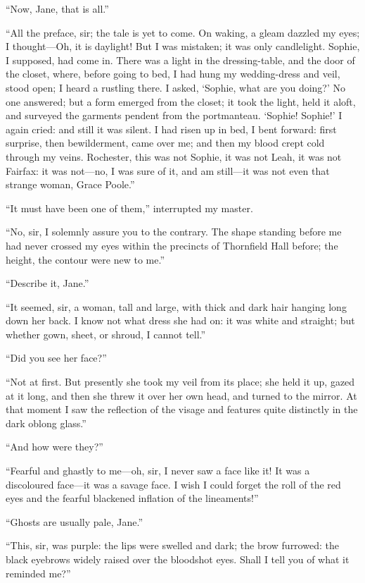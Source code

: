 \enquote{Now, Jane, that is all.}

\enquote{All the preface, sir; the tale is yet to come.  On waking, a
	gleam dazzled my eyes; I thought---Oh, it is daylight!  But I was
	mistaken; it was only candlelight.  Sophie, I supposed, had come in.
	There was a light in the dressing-table, and the door of the closet,
	where, before going to bed, I had hung my wedding-dress and veil, stood
	open; I heard a rustling there.  I asked, \enquote{Sophie, what are you
		doing?}  No one answered; but a form emerged from the closet; it took
	the light, held it aloft, and surveyed the garments pendent from the
	portmanteau.  \enquote{Sophie!  Sophie!}  I again cried: and still it
	was silent.  I had risen up in bed, I bent forward: first surprise, then
	bewilderment, came over me; and then my blood crept cold through my
	veins.  \Mr{} Rochester, this was not Sophie, it was not Leah, it was not
	\Mrs{} Fairfax: it was not---no, I was sure of it, and am still---it was
	not even that strange woman, Grace Poole.}

\enquote{It must have been one of them,} interrupted my master.

\enquote{No, sir, I solemnly assure you to the contrary.  The shape
	standing before me had never crossed my eyes within the precincts of
	Thornfield Hall before; the height, the contour were new to me.}

\enquote{Describe it, Jane.}

\enquote{It seemed, sir, a woman, tall and large, with thick and dark
	hair hanging long down her back.  I know not what dress she had on: it
	was white and straight; but whether gown, sheet, or shroud, I cannot
	tell.}

\enquote{Did you see her face?}

\enquote{Not at first.  But presently she took my veil from its place;
	she held it up, gazed at it long, and then she threw it over her own
	head, and turned to the mirror.  At that moment I saw the reflection of
	the visage and features quite distinctly in the dark oblong glass.}

\enquote{And how were they?}

\enquote{Fearful and ghastly to me---oh, sir, I never saw a face like
	it!  It was a discoloured face---it was a savage face.  I wish I could
	forget the roll of the red eyes and the fearful blackened inflation of
	the lineaments!}

\enquote{Ghosts are usually pale, Jane.}

\enquote{This, sir, was purple: the lips were swelled and dark; the brow
	furrowed: the black eyebrows widely raised over the bloodshot eyes.
	Shall I tell you of what it reminded me?}

